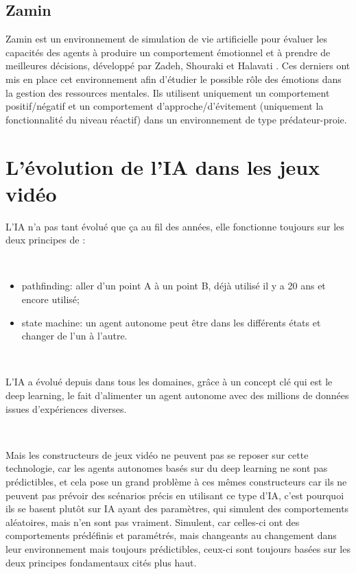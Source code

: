 \subsection{Zamin}

Zamin est un environnement de simulation de vie artificielle pour évaluer les capacités des agents à produire un comportement émotionnel et à prendre de meilleures décisions, développé par Zadeh, Shouraki et Halavati \parencite{zadeh2006emotional}. Ces derniers ont mis en place cet environnement afin d’étudier le possible rôle des émotions dans la gestion des ressources mentales. Ils utilisent uniquement un comportement positif/négatif et un comportement d'approche/d'évitement (uniquement la fonctionnalité du niveau réactif) dans un environnement de type prédateur-proie.


\section{L'évolution de l’IA dans les jeux vidéo}

L’IA n’a pas tant évolué que ça au fil des années, elle fonctionne toujours sur les deux principes de \parencite{youtubeIA}:

~\par
\begin{itemize}

\item  pathfinding: aller d’un point A à un point B, déjà utilisé il y a 20 ans et encore utilisé;

\item  state machine: un agent autonome peut être dans les différents états et changer de l’un à l’autre.

\end{itemize}

~\par
L’IA a  évolué depuis dans tous les domaines, grâce à un concept clé qui est le deep learning, le fait d'alimenter un agent autonome avec des millions de données issues d'expériences diverses. 

~\par
Mais les constructeurs de jeux vidéo ne peuvent pas se reposer sur cette technologie, car les agents autonomes basés sur du deep learning ne sont pas prédictibles, et cela pose un grand problème à ces mêmes constructeurs car ils ne peuvent pas prévoir des scénarios précis en utilisant ce type d’IA, c’est pourquoi ils se basent plutôt sur IA ayant des paramètres, qui simulent des comportements aléatoires, mais n’en sont pas vraiment. Simulent, car celles-ci ont des comportements prédéfinis et paramétrés, mais changeants au changement dans leur environnement mais toujours prédictibles, ceux-ci sont toujours basées sur les deux principes fondamentaux cités plus haut.

